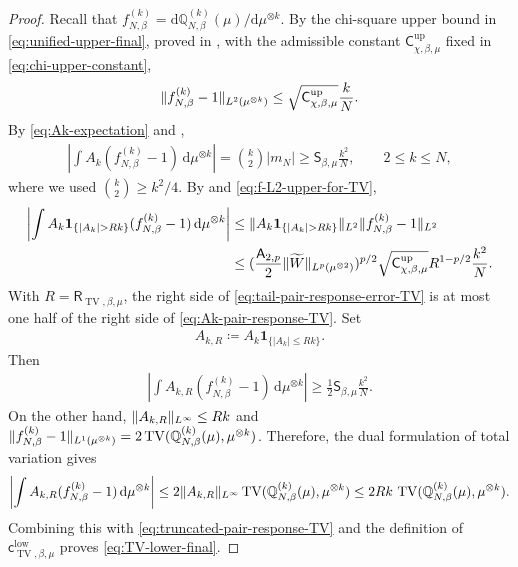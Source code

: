 \documentclass[11pt,reqno]{amsart}
\numberwithin{equation}{section}
\theoremstyle{plain}
\theoremstyle{remark}
\DeclarePairedDelimiter{\pa}{\lparen}{\rparen}
\DeclarePairedDelimiter{\norm}{\lVert}{\rVert}
\newcommand{\md}{\mathrm{d}}
\newcommand{\Q}{{\mathbb{Q}}}
\newcommand{\tl}{\widetilde}
\newcommand{\be}{\beta}
\newcommand{\TV}{\operatorname{TV}}
\newcommand{\one}{\mathbf 1}
\begin{document}
\begin{proof}
Recall that
\(f_{N,\be}^{(k)}=\md\Q_{N,\be}^{(k)}(\mu)/\md\mu^{\otimes k}\).
By the chi-square upper bound in \eqref{eq:unified-upper-final}, proved in
, with the admissible constant
\(\mathsf C_{\chi,\be,\mu}^{\mathrm{up}}\) fixed in
\eqref{eq:chi-upper-constant},
\begin{align}\label{eq:f-L2-upper-for-TV}
 \norm{f_{N,\be}^{(k)}-1}_{L^2(\mu^{\otimes k})}
 \le \sqrt{\mathsf C_{\chi,\be,\mu}^{\mathrm{up}}}\frac{k}{N}.
\end{align}
By \eqref{eq:Ak-expectation} and ,
\begin{align}\label{eq:Ak-pair-response-TV}
 \left|\int A_k(f_{N,\be}^{(k)}-1)\,\md\mu^{\otimes k}\right|
 =\binom{k}{2}|m_N|
 \ge \mathsf S_{\be,\mu}\frac{k^2}{N},
 \qquad 2\le k\le N,
\end{align}
where we used \(\binom{k}{2}\ge k^2/4\).  By  and
\eqref{eq:f-L2-upper-for-TV},
\begin{align}
 \left|\int A_k\one_{\{|A_k|>Rk\}}(f_{N,\be}^{(k)}-1)\,\md\mu^{\otimes k}\right|
 &\le \norm{A_k\one_{\{|A_k|>Rk\}}}_{L^2}
      \norm{f_{N,\be}^{(k)}-1}_{L^2} \notag\\
 &\le
      \pa{\frac{\mathsf A_{2,p}}2\norm{\tl W}_{L^p(\mu^{\otimes2})}}^{p/2}
      \sqrt{\mathsf C_{\chi,\be,\mu}^{\mathrm{up}}}
      R^{1-p/2}\frac{k^2}{N}.\label{eq:tail-pair-response-error-TV}
\end{align}
With \(R=\mathsf R_{\TV,\be,\mu}\), the right side of \eqref{eq:tail-pair-response-error-TV} is at most
one half of the right side of \eqref{eq:Ak-pair-response-TV}.
Set
\begin{align}\label{eq:AkR-def}
 A_{k,R}\coloneqq A_k\one_{\{|A_k|\le Rk\}}.
\end{align}
Then
\begin{align}\label{eq:truncated-pair-response-TV}
 \left|\int A_{k,R}(f_{N,\be}^{(k)}-1)\,\md\mu^{\otimes k}\right|
 \ge \frac12\mathsf S_{\be,\mu}\frac{k^2}{N}.
\end{align}
On the other hand, \(\norm{A_{k,R}}_{L^\infty}\le Rk\) and
\(\norm{f_{N,\be}^{(k)}-1}_{L^1(\mu^{\otimes k})}=2\TV\pa{\Q_{N,\be}^{(k)}(\mu),\mu^{\otimes k}}\).  Therefore, the dual formulation of total variation gives
\begin{align}\label{eq:truncated-test-TV-duality}
 \left|\int A_{k,R}(f_{N,\be}^{(k)}-1)\,\md\mu^{\otimes k}\right|
 \le 2\norm{A_{k,R}}_{L^\infty}\TV\pa{\Q_{N,\be}^{(k)}(\mu),\mu^{\otimes k}}
 \le 2Rk\,\TV\pa{\Q_{N,\be}^{(k)}(\mu),\mu^{\otimes k}}.
\end{align}
Combining this with \eqref{eq:truncated-pair-response-TV} and the definition of
\(\mathsf c_{\TV,\be,\mu}^{\mathrm{low}}\) proves \eqref{eq:TV-lower-final}.
\end{proof}
\end{document}
